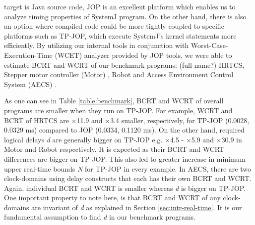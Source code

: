 target is Java source code, JOP is an excellent platform which enables us to analyze timing properties of SystemJ program. On the other hand, there is also
an option where compiled code could be more tightly coupled to specific platforms such as TP-JOP, which execute SystemJ's kernel statements more
efficiently. By utilizing our internal tools in conjunction with Worst-Case-Execution-Time (WCET) analyzer \cite{jop:jnl:jsa2007} 
provided by JOP tools, we were able to estimate BCRT and WCRT of our benchmark programs: (full-name?) HRTCS, Stepper motor controller (Motor) \cite{}, Robot 
and Access Environment Control System (AECS) \cite{}.


As one can see in Table \ref{table:benchmark}, BCRT and WCRT of overall programs are smaller when they run on TP-JOP. For example,
WCRT and BCRT of HRTCS are \(\times\)11.9 and \(\times\)3.4 smaller, respectively, for TP-JOP (0.0028, 0.0329 ms) compared to JOP (0.0334, 0.1120 ms). On the other
hand, required logical delays \emph{d} are generally bigger on TP-JOP e.g. \(\times\)4.5 - \(\times\)5.9 and \(\times\)30.9 in 
Motor and Robot respectively. It is expected as their BCRT and WCRT differences are bigger on TP-JOP. 
This also led to greater increase in minimum upper real-time bounds \emph{N} for TP-JOP in every example.
In AECS, there are two clock-domains using delay constructs that each has their own BCRT and WCRT. Again, individual BCRT and WCRT is smaller 
whereas \emph{d} is bigger on TP-JOP. One important property to note here, is that BCRT and WCRT of any clock-domains are invariant of \emph{d} as explained 
in Section \ref{sec:intr-real-time}. It is our fundamental assumption to find \emph{d} in our benchmark programs. 

















